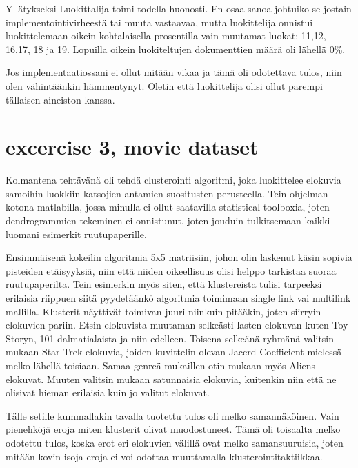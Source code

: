 \documentclass[a4paper,10pt]{article}
\begin{document}
Yllätykseksi Luokittalija toimi todella huonosti. En osaa sanoa johtuiko se jostain implementointivirheestä tai muuta vastaavaa, mutta luokittelija onnistui luokittelemaan
oikein kohtalaisella prosentilla vain muutamat luokat: 11,12, 16,17, 18 ja 19. Lopuilla oikein luokiteltujen dokumenttien määrä oli lähellä 0\%.

Jos implementaatiossani ei ollut mitään vikaa ja tämä oli odotettava tulos, niin olen vähintäänkin hämmentynyt. Oletin että luokittelija olisi ollut parempi tällaisen aineiston kanssa.

\section{excercise 3, movie dataset}
Kolmantena tehtävänä oli tehdä clusterointi algoritmi, joka luokittelee elokuvia samoihin luokkiin katsojien antamien suositusten perusteella.
Tein ohjelman kotona matlabilla, jossa minulla ei ollut saatavilla statistical toolboxia, joten dendrogrammien tekeminen ei onnistunut, joten jouduin
tulkitsemaan kaikki luomani esimerkit ruutupaperille. 

\newline

Ensimmäisenä kokeilin algoritmia 5x5 matriisiin, johon olin laskenut käsin sopivia pisteiden etäisyyksiä, niin että niiden oikeellisuus olisi helppo
tarkistaa suoraa ruutupaperilta. Tein esimerkin myös siten, että klustereista tulisi tarpeeksi erilaisia riippuen siitä pyydetäänkö algoritmia
toimimaan single link vai multilink mallilla. Klusterit näyttivät toimivan juuri niinkuin pitääkin, joten siirryin elokuvien pariin. Etsin elokuvista
muutaman selkeästi lasten elokuvan kuten Toy Storyn, 101 dalmatialaista ja niin edelleen. Toisena selkeänä ryhmänä valitsin mukaan Star Trek elokuvia, joiden
kuvittelin olevan Jaccrd Coefficient mielessä melko lähellä toisiaan. Samaa genreä mukaillen otin mukaan myös Aliens elokuvat.
Muuten valitsin mukaan satunnaisia elokuvia, kuitenkin niin että ne olisivat hieman erilaisia kuin jo valitut elokuvat.

Tälle setille kummallakin tavalla tuotettu tulos oli melko samannäköinen. Vain pienehköjä eroja miten klusterit olivat muodostuneet. Tämä oli toisaalta melko odotettu tulos, koska erot 
eri elokuvien välillä ovat melko samansuuruisia, joten mitään kovin isoja eroja ei voi odottaa muuttamalla klusterointitaktiikkaa. 
\end{document}
